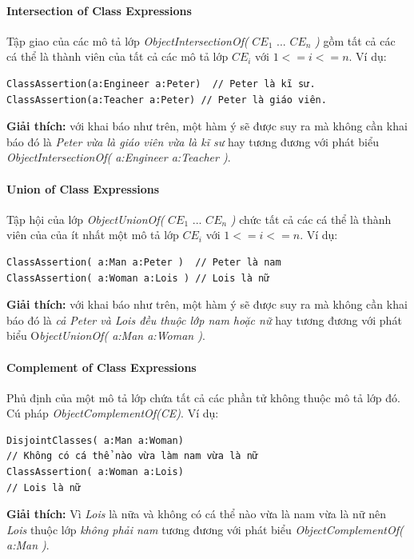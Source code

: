\paragraph{Intersection of Class Expressions} Tập giao của các mô tả lớp \textit{ObjectIntersectionOf(} $CE_{1}$ ... $CE_{n}$ \textit{)} gồm tất cả các cá thể là thành viên của tất cả các mô tả lớp $CE_{i}$ với $1<=i<=n$. Ví dụ: 
\begin{verbatim}
ClassAssertion(a:Engineer a:Peter)  // Peter là kĩ sư.
ClassAssertion(a:Teacher a:Peter) // Peter là giáo viên.
\end{verbatim}
\textbf{Giải thích: } với khai báo như trên, một hàm ý sẽ được suy ra mà không cần khai báo đó là \textit{Peter vừa là giáo viên vừa là kĩ sư} hay tương đương với phát biểu \textit{ObjectIntersectionOf( a:Engineer a:Teacher )}. 

\paragraph{Union of Class Expressions} Tập hội của lớp \textit{ObjectUnionOf(} $CE_{1}$ ... $CE_{n}$ \textit{)} chức tất cả các cá thể là thành viên của của ít nhất một mô tả lớp $CE_{i}$ với $1<=i<=n$. Ví dụ:
\begin{verbatim}
ClassAssertion( a:Man a:Peter )	 // Peter là nam
ClassAssertion( a:Woman a:Lois ) // Lois là nữ
\end{verbatim}
\textbf{Giải thích: } với khai báo như trên, một hàm ý sẽ được suy ra mà không cần khai báo đó là \textit{cả Peter và Lois đều thuộc lớp nam hoặc nữ} hay tương đương với phát biểu O\textit{bjectUnionOf( a:Man a:Woman )}.

\paragraph{Complement of Class Expressions} Phủ định của một mô tả lớp chứa tất cả các phần tử không thuộc mô tả lớp đó. Cú pháp \textit{ObjectComplementOf(CE)}. Ví dụ:
\begin{verbatim}
DisjointClasses( a:Man a:Woman) 
// Không có cá thể nào vừa làm nam vừa là nữ
ClassAssertion( a:Woman a:Lois) 
// Lois là nữ
\end{verbatim}
\textbf{Giải thích:} Vì \textit{Lois} là nữa và không có cá thể nào vừa là nam vừa là nữ nên \textit{Lois} thuộc lớp \textit{không phải nam} tương đương với phát biểu \textit{ObjectComplementOf( a:Man )}.

